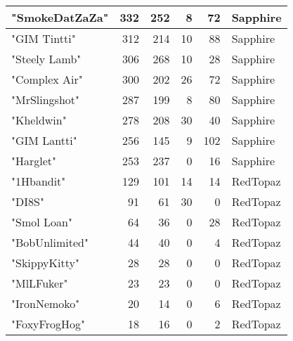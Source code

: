 \documentclass{article}
\begin{document}
\begin{table}[htbp]
\begin{tabular}{|l|r|r|r|r|l|}
"SmokeDatZaZa" & 332 & 252 & 8 & 72 & Sapphire \\ \hline
"GIM Tintti" & 312 & 214 & 10 & 88 & Sapphire \\ \hline
"Steely Lamb" & 306 & 268 & 10 & 28 & Sapphire \\ \hline
"Complex Air" & 300 & 202 & 26 & 72 & Sapphire \\ \hline
"MrSlingshot" & 287 & 199 & 8 & 80 & Sapphire \\ \hline
"Kheldwin" & 278 & 208 & 30 & 40 & Sapphire \\ \hline
"GIM Lantti" & 256 & 145 & 9 & 102 & Sapphire \\ \hline
"Harglet" & 253 & 237 & 0 & 16 & Sapphire \\ \hline
"1Hbandit" & 129 & 101 & 14 & 14 & RedTopaz \\ \hline
"DI8S" & 91 & 61 & 30 & 0 & RedTopaz \\ \hline
"Smol Loan" & 64 & 36 & 0 & 28 & RedTopaz \\ \hline
"BobUnlimited" & 44 & 40 & 0 & 4 & RedTopaz \\ \hline
"SkippyKitty" & 28 & 28 & 0 & 0 & RedTopaz \\ \hline
"MlLFuker" & 23 & 23 & 0 & 0 & RedTopaz \\ \hline
"IronNemoko" & 20 & 14 & 0 & 6 & RedTopaz \\ \hline
"FoxyFrogHog" & 18 & 16 & 0 & 2 & RedTopaz \\ \hline
\end{tabular}
\end{table}
\end{document}
